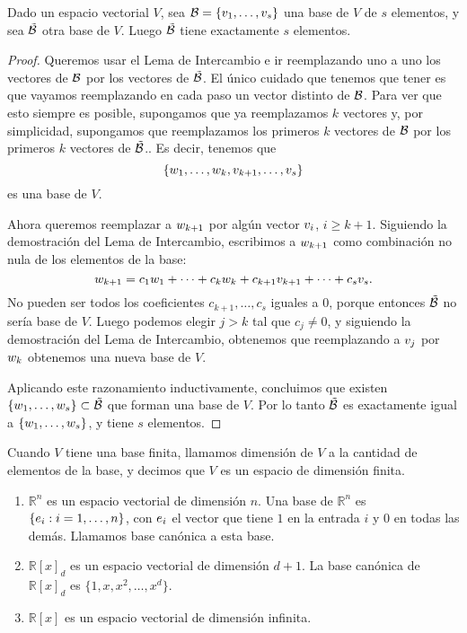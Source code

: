\begin{prop}
Dado un espacio vectorial $V$, sea $\B = \{\vb_1, \dots, \vb_s\}$ una base de $V$ de $s$ elementos, y sea $\tilde{\mathcal B}$ otra base de $V$. Luego $\tilde{\mathcal B}$ tiene exactamente $s$ elementos.
\end{prop}
\begin{proof}
Queremos usar el Lema de Intercambio e ir reemplazando uno a uno los vectores de $\mathcal B$ por los vectores de $\tilde{\mathcal B}$. El \'unico cuidado que tenemos que tener es que vayamos reemplazando en cada paso un vector distinto de $\mathcal B$.
Para ver que esto siempre es posible, supongamos que ya reemplazamos $k$ vectores y, por simplicidad, supongamos que reemplazamos los primeros $k$ vectores de $\mathcal B$ por los primeros $k$ vectores de $\tilde{\mathcal B}$.. Es decir, tenemos que
$$
\{\wb_1, \dots, \wb_k, \vb_{k+1}, \dots, \vb_s\}
$$
es una base de $V$.

Ahora queremos reemplazar a $\wb_{k+1}$ por alg\'un vector $\vb_i$, $i \ge k+1$. Siguiendo la demostración del Lema de Intercambio, escribimos a $\wb_{k+1}$ como combinaci\'on no nula de los elementos de la base:
$$ \wb_{k+1} = c_1 \wb_1 + \dots + c_k \wb_k + c_{k+1} \vb_{k+1} + \dots + c_s \vb_s.$$
No pueden ser todos los coeficientes $c_{k+1}, \dots, c_s$ iguales a 0, porque entonces $\tilde{\mathcal B}$ no sería base de $V$. Luego podemos elegir $j > k$ tal que $c_j \neq 0$, y siguiendo la demostraci\'on del Lema de Intercambio, obtenemos que reemplazando a $\vb_j$ por $\wb_k$ obtenemos una nueva base de $V$.

Aplicando este razonamiento inductivamente, concluimos que existen $\{\wb_1, \dots, \wb_s\} \subset \tilde\B$ que forman una base de $V$. Por lo tanto $\tilde{\mathcal B}$ es exactamente igual a $\{\wb_1, \dots, \wb_s\}$, y tiene $s$ elementos.
\end{proof}

Cuando $V$ tiene una base finita, llamamos dimensión de $V$ a la cantidad de elementos de la base, y decimos que $V$ es un espacio de dimensión finita.

\begin{ejemplo}\leavevmode
\begin{enumerate}
\item $\mathbb{R}^n$ es un espacio vectorial de dimensión $n$. Una base de $\mathbb{R}^n$ es $\{\eb_i: i = 1, \dots, n\}$, con $\eb_i$ el vector que tiene $1$ en la entrada $i$ y $0$ en todas las demás. Llamamos base canónica a esta base.
\item $\mathbb{R}[x]_d$ es un espacio vectorial de dimensión $d+1$. La base canónica de $\mathbb{R}[x]_d$ es $\{1, x, x^2, \dots, x^d\}$.
\item $\mathbb{R}[x]$ es un espacio vectorial de dimensión infinita.
\end{enumerate}
\end{ejemplo}


